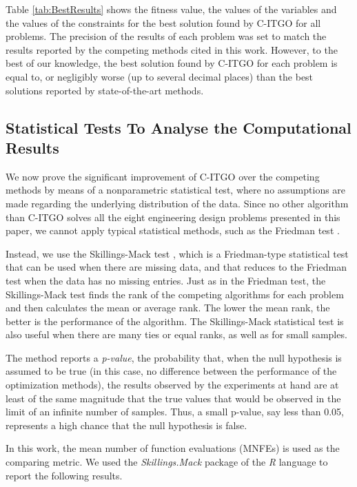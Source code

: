 Table \ref{tab:BestResults} shows the fitness value, the values of the variables and the values of the constraints for the best solution found by C-ITGO for all problems. The precision of the results of each problem was set to match the results reported by the competing methods cited in this work. However, to the best of our knowledge, the best solution found by C-ITGO for each problem is equal to, or negligibly worse (up to several decimal places) than the best solutions reported by state-of-the-art methods.




\subsection{Statistical Tests To Analyse the Computational Results}

We now prove the significant improvement of C-ITGO over the competing methods by means of a nonparametric statistical test, where no assumptions are made regarding the underlying distribution of the data. Since no other algorithm than C-ITGO solves all the eight engineering design problems presented in this paper, we cannot apply typical statistical methods, such as the Friedman test \citep{Friedman}.

Instead, we use the Skillings-Mack test \citep{Skillings}, which is a Friedman\allowbreak-type statistical test that can be used when there are missing data, and that reduces to the Friedman test when the data has no missing entries. Just as in the Friedman test, the Skillings-Mack test finds the rank of the competing algorithms for each problem and then calculates the mean or average rank. The lower the mean rank, the better is the performance of the algorithm. The Skillings-Mack statistical test is also useful when there are many ties or equal ranks, as well as for small samples.

The method reports a \textit{p-value}, the probability that, when the null hypothesis is assumed to be true (in this case, no difference between the performance of the optimization methods), the results observed by the experiments at hand are at least of the same magnitude that the true values that would be observed in the limit of an infinite number of samples. Thus, a small p-value, say less than 0.05, represents a high chance that the null hypothesis is false.

In this work, the mean number of function evaluations (MNFEs) is used as the comparing metric. We used the \textit{Skillings.Mack} package \citep{SkillMack} of the \textit{R} language \citep{R} to report the following results.


